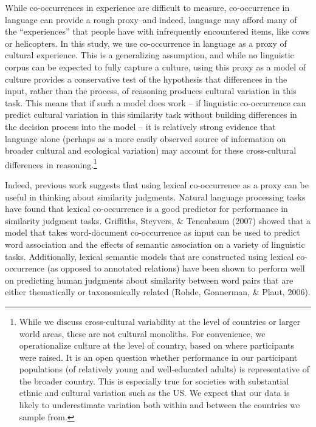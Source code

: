 \documentclass[10pt, letterpaper]{article}
\begin{document}
While co-occurrences in experience are difficult to measure,
co-occurrence in language can provide a rough proxy--and indeed,
language may afford many of the ``experiences'' that people have with
infrequently encountered items, like cows or helicopters. In this study,
we use co-occurrence in language as a proxy of cultural experience. This
is a generalizing assumption, and while no linguistic corpus can be
expected to fully capture a culture, using this proxy as a model of
culture provides a conservative test of the hypothesis that differences
in the input, rather than the process, of reasoning produces cultural
variation in this task. This means that if such a model does work -- if
linguistic co-occurrence can predict cultural variation in this
similarity task without building differences in the decision process
into the model -- it is relatively strong evidence that language alone
(perhaps as a more easily observed source of information on broader
cultural and ecological variation) may account for these cross-cultural
differences in reasoning.\footnote{While we discuss cross-cultural
  variability at the level of countries or larger world areas, these are
  not cultural monoliths. For convenience, we operationalize culture at
  the level of country, based on where participants were raised. It is
  an open question whether performance in our participant populations
  (of relatively young and well-educated adults) is representative of
  the broader country. This is especially true for societies with
  substantial ethnic and cultural variation such as the US. We expect
  that our data is likely to underestimate variation both within and
  between the countries we sample from.}

Indeed, previous work suggests that using lexical co-occurrence as a
proxy can be useful in thinking about similarity judgments. Natural
language processing tasks have found that lexical co-occurrence is a
good predictor for performance in similarity judgment tasks. Griffiths,
Steyvers, \& Tenenbaum (2007) showed that a model that takes
word-document co-occurrence as input can be used to predict word
association and the effects of semantic association on a variety of
linguistic tasks. Additionally, lexical semantic models that are
constructed using lexical co-occurrence (as opposed to annotated
relations) have been shown to perform well on predicting human judgments
about similarity between word pairs that are either thematically or
taxonomically related (Rohde, Gonnerman, \& Plaut, 2006).
\end{document}
